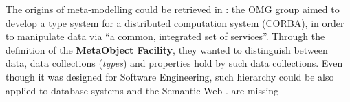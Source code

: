 
The origins of meta-modelling could be retrieved in \cite{omg96}: the OMG group aimed to develop a type system for a distributed computation system (CORBA), in order to manipulate data via ``a common, integrated set of services''. Through the definition of the \textbf{MetaObject Facility}, they wanted to distinguish between data, data collections (\textit{types}) and properties hold by such data collections. Even though it was designed for Software Engineering, such hierarchy could be also applied to database systems \cite{atzeni,encyclopedia} and the Semantic Web \cite{BrasileiroACG16}. are missing

